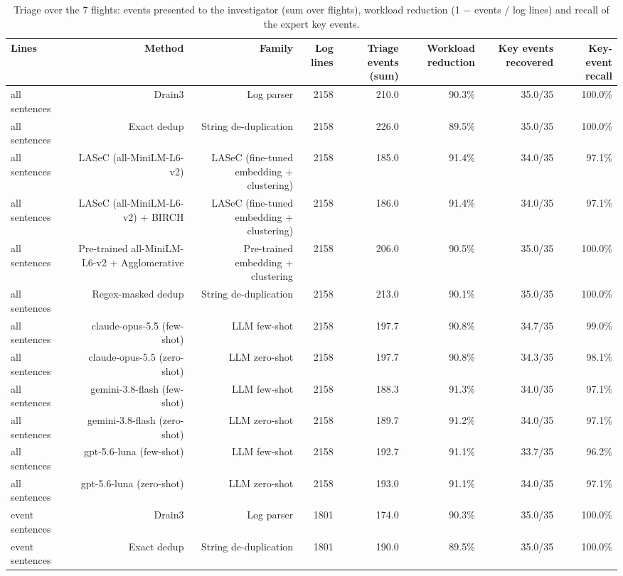 \begin{table}[t]
\centering
\caption{Triage over the 7 flights: events presented to the investigator (sum over flights), workload reduction (1 − events / log lines) and recall of the expert key events.}
\label{tab:case_study_methods}
\small
\begin{tabular}{lrrrrrrr}
\toprule
Lines & Method & Family & Log lines & Triage events (sum) & Workload reduction & Key events recovered & Key-event recall \\
\midrule
all sentences & Drain3 & Log parser & 2158 & 210.0 & 90.3\% & 35.0/35 & 100.0\% \\
all sentences & Exact dedup & String de-duplication & 2158 & 226.0 & 89.5\% & 35.0/35 & 100.0\% \\
all sentences & LASeC (all-MiniLM-L6-v2) & LASeC (fine-tuned embedding + clustering) & 2158 & 185.0 & 91.4\% & 34.0/35 & 97.1\% \\
all sentences & LASeC (all-MiniLM-L6-v2) + BIRCH & LASeC (fine-tuned embedding + clustering) & 2158 & 186.0 & 91.4\% & 34.0/35 & 97.1\% \\
all sentences & Pre-trained all-MiniLM-L6-v2 + Agglomerative & Pre-trained embedding + clustering & 2158 & 206.0 & 90.5\% & 35.0/35 & 100.0\% \\
all sentences & Regex-masked dedup & String de-duplication & 2158 & 213.0 & 90.1\% & 35.0/35 & 100.0\% \\
all sentences & claude-opus-5.5 (few-shot) & LLM few-shot & 2158 & 197.7 & 90.8\% & 34.7/35 & 99.0\% \\
all sentences & claude-opus-5.5 (zero-shot) & LLM zero-shot & 2158 & 197.7 & 90.8\% & 34.3/35 & 98.1\% \\
all sentences & gemini-3.8-flash (few-shot) & LLM few-shot & 2158 & 188.3 & 91.3\% & 34.0/35 & 97.1\% \\
all sentences & gemini-3.8-flash (zero-shot) & LLM zero-shot & 2158 & 189.7 & 91.2\% & 34.0/35 & 97.1\% \\
all sentences & gpt-5.6-luna (few-shot) & LLM few-shot & 2158 & 192.7 & 91.1\% & 33.7/35 & 96.2\% \\
all sentences & gpt-5.6-luna (zero-shot) & LLM zero-shot & 2158 & 193.0 & 91.1\% & 34.0/35 & 97.1\% \\
event sentences & Drain3 & Log parser & 1801 & 174.0 & 90.3\% & 35.0/35 & 100.0\% \\
event sentences & Exact dedup & String de-duplication & 1801 & 190.0 & 89.5\% & 35.0/35 & 100.0\% \\

\end{tabular}
\end{table}
